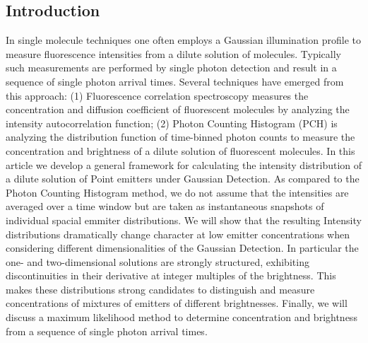 \documentclass[%
 reprint,
 amsmath,amssymb,
 aps,
]{revtex4-1}
\begin{document}
\subsection{Introduction}
In single molecule techniques one often employs a Gaussian illumination profile to measure fluorescence intensities from a dilute solution of molecules.  Typically such measurements are performed by single photon detection and result in a sequence of single photon arrival times.  Several techniques have emerged from this approach: (1) Fluorescence correlation spectroscopy measures the concentration and diffusion coefficient of fluorescent molecules by analyzing the intensity autocorrelation function; (2) Photon Counting Histogram (PCH) is analyzing the distribution function of time-binned photon counts to measure the concentration and brightness of a dilute solution of fluorescent molecules.  In this article we develop a general framework for calculating the intensity distribution of a dilute solution of Point emitters under Gaussian Detection.  As compared to the Photon Counting Histogram method, we do not assume that the intensities are averaged over a time window but are taken as instantaneous snapshots of individual spacial emmiter distributions.  We will show that the resulting Intensity distributions dramatically change character at low emitter concentrations when considering different dimensionalities of the Gaussian Detection.  In particular the one- and two-dimensional solutions are strongly structured, exhibiting discontinuities in their derivative at integer multiples of the brightness.  This makes these distributions strong candidates to distinguish and measure concentrations of mixtures of emitters of different brightnesses.  Finally, we will discuss a maximum likelihood method to determine concentration and brightness from a sequence of single photon arrival times. 
\end{document}

